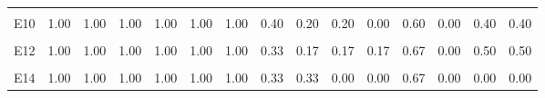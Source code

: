 \begin{table}[H]
\begin{tabular}[t]{lrrrrrrrrrrrrrr}
\cellcolor{gray!6}{E9} & \cellcolor{gray!6}{0.92} & \cellcolor{gray!6}{0.83} & \cellcolor{gray!6}{0.83} & \cellcolor{gray!6}{0.75} & \cellcolor{gray!6}{0.75} & \cellcolor{gray!6}{0.75} & \cellcolor{gray!6}{0.58} & \cellcolor{gray!6}{0.25} & \cellcolor{gray!6}{0.00} & \cellcolor{gray!6}{0.67} & \cellcolor{gray!6}{0.75} & \cellcolor{gray!6}{0.58} & \cellcolor{gray!6}{0.75} & \cellcolor{gray!6}{0.75}\\
E10 & 1.00 & 1.00 & 1.00 & 1.00 & 1.00 & 1.00 & 0.40 & 0.20 & 0.20 & 0.00 & 0.60 & 0.00 & 0.40 & 0.40\\
\addlinespace
\cellcolor{gray!6}{E11} & \cellcolor{gray!6}{1.00} & \cellcolor{gray!6}{1.00} & \cellcolor{gray!6}{1.00} & \cellcolor{gray!6}{1.00} & \cellcolor{gray!6}{1.00} & \cellcolor{gray!6}{1.00} & \cellcolor{gray!6}{0.50} & \cellcolor{gray!6}{0.75} & \cellcolor{gray!6}{0.25} & \cellcolor{gray!6}{0.50} & \cellcolor{gray!6}{0.00} & \cellcolor{gray!6}{0.50} & \cellcolor{gray!6}{0.75} & \cellcolor{gray!6}{0.75}\\
E12 & 1.00 & 1.00 & 1.00 & 1.00 & 1.00 & 1.00 & 0.33 & 0.17 & 0.17 & 0.17 & 0.67 & 0.00 & 0.50 & 0.50\\
\cellcolor{gray!6}{E13} & \cellcolor{gray!6}{1.00} & \cellcolor{gray!6}{1.00} & \cellcolor{gray!6}{1.00} & \cellcolor{gray!6}{1.00} & \cellcolor{gray!6}{1.00} & \cellcolor{gray!6}{1.00} & \cellcolor{gray!6}{0.33} & \cellcolor{gray!6}{0.33} & \cellcolor{gray!6}{0.00} & \cellcolor{gray!6}{0.00} & \cellcolor{gray!6}{0.67} & \cellcolor{gray!6}{0.00} & \cellcolor{gray!6}{0.00} & \cellcolor{gray!6}{0.00}\\
E14 & 1.00 & 1.00 & 1.00 & 1.00 & 1.00 & 1.00 & 0.33 & 0.33 & 0.00 & 0.00 & 0.67 & 0.00 & 0.00 & 0.00\\
\bottomrule
\end{tabular}
\end{table}
